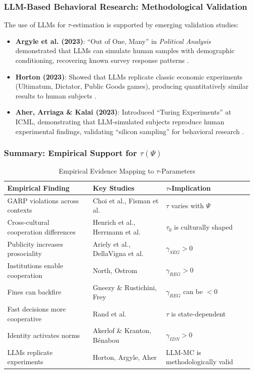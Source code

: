 \subsubsection{LLM-Based Behavioral Research: Methodological Validation}

The use of LLMs for $\tau$-estimation is supported by emerging validation studies:

\begin{itemize}
\item \textbf{Argyle et al. (2023)}: ``Out of One, Many'' in \textit{Political Analysis} demonstrated that LLMs can simulate human samples with demographic conditioning, recovering known survey response patterns \cite{argyle2023}.

\item \textbf{Horton (2023)}: Showed that LLMs replicate classic economic experiments (Ultimatum, Dictator, Public Goods games), producing quantitatively similar results to human subjects \cite{horton2023}.

\item \textbf{Aher, Arriaga \& Kalai (2023)}: Introduced ``Turing Experiments'' at ICML, demonstrating that LLM-simulated subjects reproduce human experimental findings, validating ``silicon sampling'' for behavioral research \cite{aher2023}.
\end{itemize}

\subsubsection{Summary: Empirical Support for $\tau(\Psi)$}

\begin{table}[htbp]
\centering
\caption{Empirical Evidence Mapping to $\tau$-Parameters}
\label{tab:tau-evidence}
\renewcommand{\arraystretch}{1.3}
\begin{tabular}{@{}p{4.5cm}p{4cm}p{4cm}@{}}
\toprule
\textbf{Empirical Finding} & \textbf{Key Studies} & \textbf{$\tau$-Implication} \\
\midrule
GARP violations across contexts & Choi et al., Fisman et al. & $\tau$ varies with $\Psi$ \\
Cross-cultural cooperation differences & Henrich et al., Herrmann et al. & $\tau_0$ is culturally shaped \\
Publicity increases prosociality & Ariely et al., DellaVigna et al. & $\gamma_{SEG} > 0$ \\
Institutions enable cooperation & North, Ostrom & $\gamma_{REG} > 0$ \\
Fines can backfire & Gneezy \& Rustichini, Frey & $\gamma_{REG}$ can be $< 0$ \\
Fast decisions more cooperative & Rand et al. & $\tau$ is state-dependent \\
Identity activates norms & Akerlof \& Kranton, Bénabou & $\gamma_{IDN} > 0$ \\
LLMs replicate experiments & Horton, Argyle, Aher & LLM-MC is methodologically valid \\
\bottomrule
\end{tabular}
\end{table}



